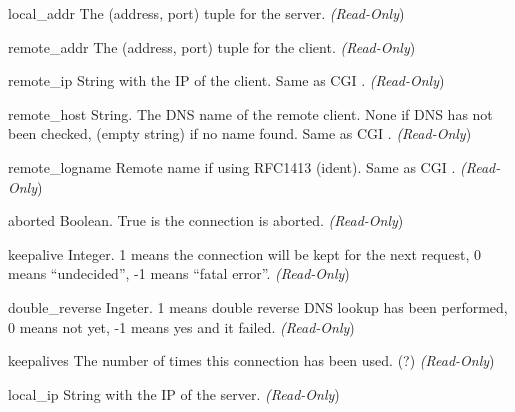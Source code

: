 \begin{memberdesc}[connection]{local_addr}
  The (address, port) tuple for the server.
  \emph{(Read-Only})
\end{memberdesc}

\begin{memberdesc}[connection]{remote_addr}
  The (address, port) tuple for the client.
  \emph{(Read-Only})
\end{memberdesc}

\begin{memberdesc}[connection]{remote_ip}
  String with the IP of the client. Same as CGI .
  \emph{(Read-Only})
\end{memberdesc}

\begin{memberdesc}[connection]{remote_host}
  String. The DNS name of the remote client. None if DNS has not been
  checked,  (empty string) if no name found. Same as CGI .
  \emph{(Read-Only})
\end{memberdesc}

\begin{memberdesc}[connection]{remote_logname}
  Remote name if using RFC1413 (ident). Same as CGI .
  \emph{(Read-Only})
\end{memberdesc}

\begin{memberdesc}[connection]{aborted}
  Boolean. True is the connection is aborted.
  \emph{(Read-Only})
\end{memberdesc}

\begin{memberdesc}[connection]{keepalive}
  Integer. 1 means the connection will be kept for the next request, 0 means
  ``undecided'', -1 means ``fatal error''.
  \emph{(Read-Only})
\end{memberdesc}

\begin{memberdesc}[connection]{double_reverse}
  Ingeter. 1 means double reverse DNS lookup has been performed, 0 means
  not yet, -1 means yes and it failed.
  \emph{(Read-Only})
\end{memberdesc}

\begin{memberdesc}[connection]{keepalives}
  The number of times this connection has been used. (?)
  \emph{(Read-Only})
\end{memberdesc}

\begin{memberdesc}[connection]{local_ip}
  String with the IP of the server.
  \emph{(Read-Only})
\end{memberdesc}

